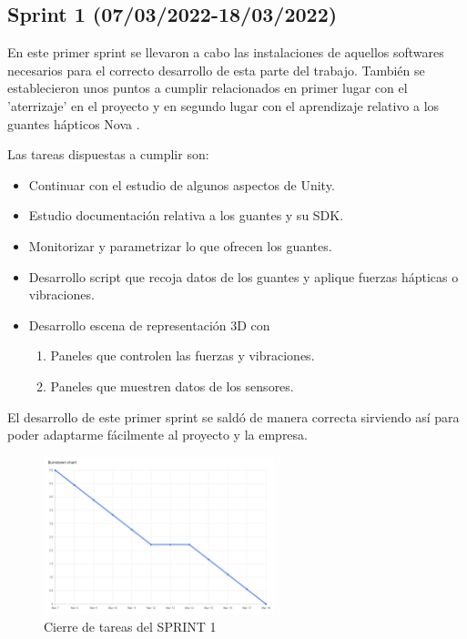 \subsection{\textbf{Sprint 1 (07/03/2022-18/03/2022)}}
En este primer sprint se llevaron a cabo las instalaciones de aquellos softwares necesarios para el correcto desarrollo de esta parte del trabajo. También se establecieron unos puntos a cumplir relacionados en primer lugar con el 'aterrizaje' en el proyecto y en segundo lugar con el aprendizaje relativo a los guantes hápticos Nova \cite{SGloveNova}.

Las tareas dispuestas a cumplir son:
\begin{itemize}
    \item Continuar con el estudio de algunos aspectos de Unity\cite{Unity}.
    \item Estudio documentación relativa a los guantes y su SDK.
    \item Monitorizar y parametrizar lo que ofrecen los guantes.
    \item Desarrollo script que recoja datos de los guantes y aplique fuerzas hápticas\cite{Haptica1} o vibraciones.
    \item Desarrollo escena de representación 3D con \begin{enumerate}
        \item Paneles que controlen las fuerzas y vibraciones.
        \item Paneles que muestren datos de los sensores.
    \end{enumerate}
\end{itemize}

El desarrollo de este primer sprint se saldó de manera correcta sirviendo así para poder adaptarme fácilmente al proyecto y la empresa.


\newpage
\begin{figure}[t]
\centering
\label{Cierre de tareas del SPRINT 1}
\includegraphics[width=0.6\textwidth]{img/sprint1.PNG}
\caption{Cierre de tareas del SPRINT 1}
\end{figure}

